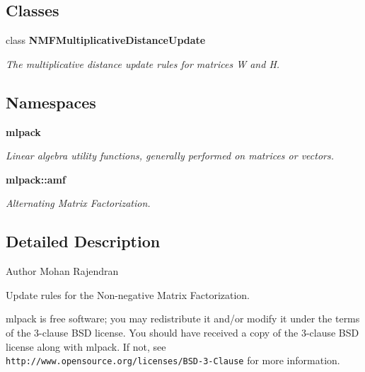 \subsection*{Classes}
\begin{DoxyCompactItemize}
\item 
class \textbf{ N\+M\+F\+Multiplicative\+Distance\+Update}
\begin{DoxyCompactList}\small\item\em The multiplicative distance update rules for matrices W and H. \end{DoxyCompactList}\end{DoxyCompactItemize}
\subsection*{Namespaces}
\begin{DoxyCompactItemize}
\item 
 \textbf{ mlpack}
\begin{DoxyCompactList}\small\item\em Linear algebra utility functions, generally performed on matrices or vectors. \end{DoxyCompactList}\item 
 \textbf{ mlpack\+::amf}
\begin{DoxyCompactList}\small\item\em Alternating Matrix Factorization. \end{DoxyCompactList}\end{DoxyCompactItemize}


\subsection{Detailed Description}
\begin{DoxyAuthor}{Author}
Mohan Rajendran
\end{DoxyAuthor}
Update rules for the Non-\/negative Matrix Factorization.

mlpack is free software; you may redistribute it and/or modify it under the terms of the 3-\/clause B\+SD license. You should have received a copy of the 3-\/clause B\+SD license along with mlpack. If not, see {\tt http\+://www.\+opensource.\+org/licenses/\+B\+S\+D-\/3-\/\+Clause} for more information. 